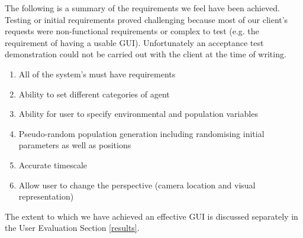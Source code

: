 The following is a summary of the requirements we feel have been achieved. Testing or initial requirements proved challenging because most of our client's requests were non-functional requirements or complex to test (e.g. the requirement of having a usable GUI). Unfortunately an acceptance test demonstration could not be carried out with the client at the time of writing.

\begin{enumerate}
\item{All of the system's must have requirements}
\item{Ability to set different categories of agent}
\item{Ability for user to specify environmental and population variables}
\item{Pseudo-random population generation including randomising initial parameters as well as positions}
\item{Accurate timescale}
\item{Allow user to change the perspective (camera location and visual representation)}
\end{enumerate}

The extent to which we have achieved an effective GUI is discussed separately in the User Evaluation Section \ref{results}. 
